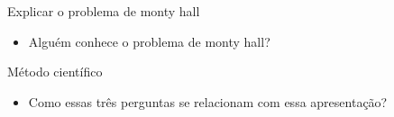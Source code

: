\begin{frame}	
	\begin{block}{Explicar o problema de monty hall}	
			\begin{itemize}
				\item Alguém conhece o problema de monty hall?
			\end{itemize}
	\end{block}
\end{frame}


\begin{frame}	
	\begin{block}{Método científico}	
			\begin{itemize}
				\item Como essas três perguntas se relacionam com essa apresentação?
			\end{itemize}
	\end{block}
\end{frame}


			